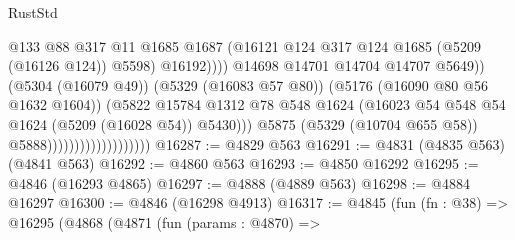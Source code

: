 \begin{lexlean}{RustStd}
\begin{coremodule}
                                                        @133
                                                        @88
                                                        @317
                                                        @11
                                                        @1685
                                                        @1687
                                                        (@16121
                                                          @124
                                                          @317
                                                          @124
                                                          @1685
                                                          (@5209 (@16126 @124))
                                                          @5598)
                                                        @16192))))
                                                @14698
                                                @14701
                                                @14704
                                                @14707
                                                @5649))
                                            (@5304 (@16079 @49))
                                            (@5329 (@16083 @57 @80))
                                            (@5176 (@16090 @80 @56 @1632 @1604))
                                            (@5822
                                              @15784
                                              @1312
                                              @78
                                              @548
                                              @1624
                                              (@16023
                                                @54
                                                @548
                                                @54
                                                @1624
                                                (@5209 (@16028 @54))
                                                @5430)))
                                          @5875
                                          (@5329 (@10704 @655 @58))
                                          @5888)))))))))))))))))))
@16287 := @4829 @563
@16291 := @4831 (@4835 @563) (@4841 @563)
@16292 := @4860 @563
@16293 := @4850 @16292
@16295 := @4846 (@16293 @4865)
@16297 := @4888 (@4889 @563)
@16298 := @4884 @16297
@16300 := @4846 (@16298 @4913)
@16317 := @4845
    (fun (fn : @38) =>
    @16295
      (@4868
        (@4871
          (fun (params : @4870) =>

\end{coremodule}
\end{lexlean}
